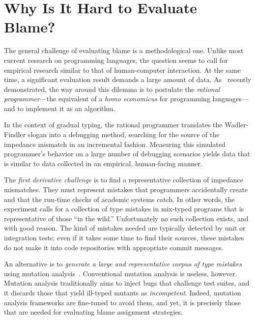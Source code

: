 \section{Why Is It Hard to Evaluate Blame?}
\label{sec:challenges}


The general challenge of evaluating blame is a methodological one. Unlike most
current research on programming languages, the question seems to call for
empirical research similar to that of human-computer interaction. At the same
time, a significant evaluation result demands a large amount of
data. As~\citet{lksfd-popl-2020} recently demonstrated, the way around this
dilemma is to postulate the {\em rational programmer\/}---the equivalent of a
{\it homo economicus\/} for programming languages---and to implement it as an algorithm.

In the context of gradual typing, the rational programmer translates the
Wadler-Findler slogan into a debugging method, searching for the source of the
impedance mismatch in an incremental fashion. Measuring this simulated
programmer's behavior on a large number of debugging scenarios yields data that
is similar to data collected in an empirical, human-facing manner.

The {\em first derivative challenge\/} is to find a representative collection of
impedance mismatches. They must represent mistakes that programmers accidentally
create and that the run-time checks of academic systems catch. In other words,
the experiment calls for a collection of type mistakes in mix-typed programs
that is representative of those ``in the wild.''  Unfortunately no such
collection exists, and with good reason. The kind of mistakes needed are
typically detected by unit or integration tests; even if it takes some time to
find their sources, these mistakes do not make it into code repositories with
appropriate commit messages.

An alternative is to {\em generate a large and representative corpus of type
mistakes \/} using mutation analysis~\cite{lipton1971fault, demillo1978hints,
jia2011analysis}.  Conventional mutation analysis is useless, however. Mutation
analysis traditionally aims to inject bugs that challenge test suites, and it
discards those that yield ill-typed mutants as \emph{incompetent}.  Indeed,
mutation analysis frameworks are fine-tuned to avoid them, and yet, it is
precisely those that are needed for evaluating blame assignment strategies.

